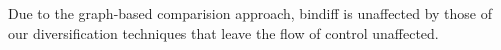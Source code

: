 \documentclass[letterpaper,twocolumn,10pt]{article}
\begin{document}
Due to the graph-based comparision approach, bindiff is unaffected by those of
our
diversification techniques that leave the flow of control unaffected.

\end{document}

